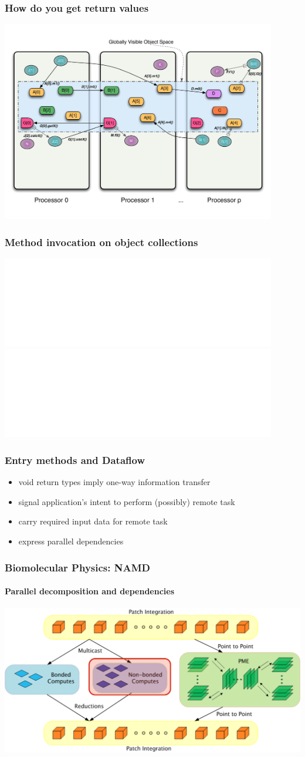 \begin{frame}
\frametitle{How do you get return values}
	\begin{center}
        \includegraphics[width=0.9\textwidth]{../figures/progmodel/13-rmi-return-values.pdf}
	\end{center}
\end{frame}


\begin{frame}
\frametitle{Method invocation on object collections}
	\begin{center}
        \includegraphics<1>[width=0.9\textwidth]{../figures/progmodel/13-rmi-return-values.pdf}
        \includegraphics<2>[width=0.9\textwidth]{../figures/progmodel/14-rmi-collective.pdf}
	\end{center}
\end{frame}


\begin{frame}
\frametitle{Entry methods and Dataflow}
    \begin{itemize}
        \item void return types imply one-way information transfer
        \item signal application's intent to perform (possibly) remote task
        \item carry required input data for remote task
        \item express parallel dependencies
    \end{itemize}
\end{frame}


\begin{frame}
\frametitle{Biomolecular Physics: NAMD}
\framesubtitle{Parallel decomposition and dependencies}
\includegraphics[width=\textwidth]{../figures/md_parallelize.pdf}
\end{frame}



